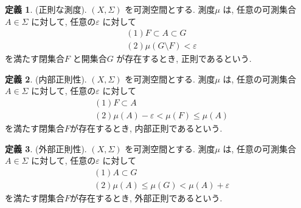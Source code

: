 \documentclass[10pt, fleqn, label-section=none]{bxjsarticle}
\theoremstyle{definition}
\newtheorem{dfn}{定義}[section]
\newcommand{\veps}{\varepsilon}
\renewcommand{\;}{\, ; \,}
\begin{document}
\begin{dfn}(正則な測度).
$(X, \Sigma)$ を可測空間とする. 測度$\mu$ は, 任意の可測集合$A \in \Sigma$ に対して, 任意の$\veps$ に対して
\begin{align*} &(1)F\subset A \subset G \\ &(2)\mu(G \setminus F) < \veps \end{align*}
を満たす閉集合$F$ と開集合$G$ が存在するとき, 正則であるという. 
\end{dfn}

\begin{dfn}(内部正則性).
$(X, \Sigma)$ を可測空間とする. 測度$\mu$ は, 任意の可測集合$A \in \Sigma$ に対して, 任意の$\veps$ に対して
\begin{align*} &(1)F\subset A \\ &(2) \mu(A) - \veps < \mu(F) \leq \mu(A) \end{align*}
を満たす閉集合$F$が存在するとき, 内部正則であるという. 
\end{dfn}

\begin{dfn}(外部正則性). 
$(X, \Sigma)$ を可測空間とする. 測度$\mu$ は, 任意の可測集合$A \in \Sigma$ に対して, 任意の$\veps$ に対して
\begin{align*} &(1)A\subset G \\ &(2) \mu(A) \leq \mu(G) < \mu(A) + \veps \end{align*}
を満たす閉集合$F$が存在するとき, 外部正則であるという. 
\end{dfn}
\end{document}
